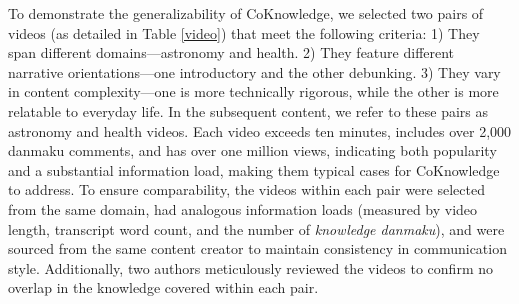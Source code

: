 To demonstrate the generalizability of CoKnowledge, we selected two pairs of videos (as detailed in Table \ref{video}) that meet the following criteria: 1) They span different domains—astronomy and health. 2) They feature different narrative orientations—one introductory and the other debunking. 3) They vary in content complexity—one is more technically rigorous, while the other is more relatable to everyday life. In the subsequent content, we refer to these pairs as astronomy and health videos. Each video exceeds ten minutes, includes over 2,000 danmaku comments, and has over one million views, indicating both popularity and a substantial information load,  making them typical cases for CoKnowledge to address.
To ensure comparability, the videos within each pair were selected from the same domain, had analogous information loads (measured by video length, transcript word count, and the number of \textit{knowledge danmaku}), and were sourced from the same content creator to maintain consistency in communication style. Additionally, two authors meticulously reviewed the videos to confirm no overlap in the knowledge covered within each pair.




